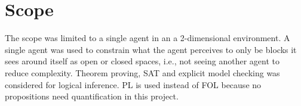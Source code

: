 \section{Scope}
The scope was limited to a single agent in an a 2-dimensional environment. A single agent was used to constrain what the agent perceives to only be blocks it sees around itself as open or closed spaces, i.e., not seeing another agent to reduce complexity. Theorem proving, SAT and explicit model checking  was considered for logical inference. PL is used instead of FOL because no propositions need quantification in this project.


